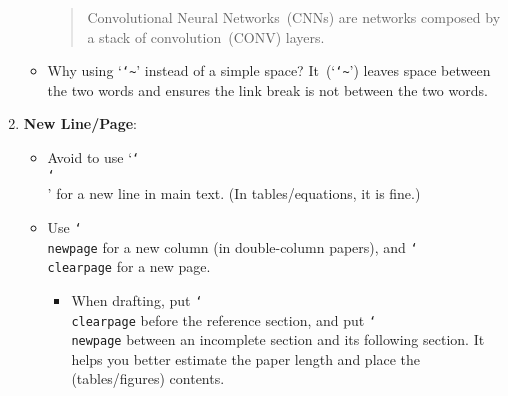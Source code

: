 \begin{enumerate}
\begin{itemize}
\begin{quote}
\begin{scriptsize}
      Convolutional Neural Networks~(CNNs) are networks composed by a stack of convolution~(CONV) layers.
    \end{scriptsize}\end{quote}

    \item Why using `\texttt{\char`\~}' instead of a simple space? It~(`\texttt{\char`\~}') leaves space between the two words and ensures the link break is not between the two words.
  \end{itemize}

  \item \textbf{New Line/Page}:
  \begin{itemize}
    \item Avoid to use `\texttt{\char`\\\char`\\}' for a new line in main text. (In tables/equations, it is fine.)
    \item Use \texttt{\char`\\newpage} for a new column (in double-column papers), and \texttt{\char`\\clearpage} for a new page.
    \begin{itemize}
      \item When drafting, put \texttt{\char`\\clearpage} before the reference section, and put \texttt{\char`\\newpage} between an incomplete section and its following section. It helps you better estimate the paper length and place the (tables/figures) contents.
    \end{itemize}
  \end{itemize}


\end{enumerate}
